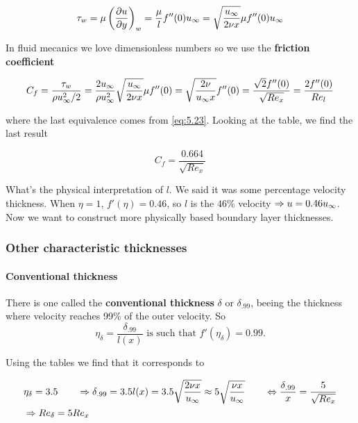 			\begin{equation}
				\tau_w = \mu \left( \frac{\partial u}{\partial y}\right)_w  = \frac{\mu}{l} f''(0) \uinf = \sqrt{\frac{\uinf}{2\nu x}}\mu f''(0)\uinf
			\end{equation}
			
			In fluid mecanics we love dimensionless numbers so we use the \textbf{friction coefficient}
			
			\begin{equation}
				C_f = \frac{\tau _w}{\rho \uinf ^2 /2} = \frac{2 \uinf}{\rho \uinf ^2}\sqrt{\frac{\uinf}{2\nu x}} \mu f''(0) = \sqrt{\frac{2\nu}{\uinf x}} f''(0) = \frac{\sqrt{2}f''(0)}{\sqrt{Re_x}} = \frac{2 f''(0)}{Re_l}
			\end{equation}
			
			where the last equivalence comes from \eqref{eq:5.23}. Looking at the table, we find the last result 
			
			\begin{equation}
				C_f = \frac{0.664}{\sqrt{Re_x}}
			\end{equation}
			
			What's the physical interpretation of $l$.  We said it was some percentage velocity thickness. When $\eta = 1$, $f'(\eta) = 0.46$, so $l$ is the $46\%$ velocity $\Rightarrow u = 0.46 \uinf$. Now we want to construct more physically based boundary layer thicknesses. 
			
		\subsubsection{Other characteristic thicknesses}
			\paragraph{Conventional thickness} There is one called the \textbf{conventional thickness} $\delta$ or $\delta _{.99}$, beeing the thickness where velocity reaches 99\% of the outer velocity. So 
			\begin{equation}
				\eta _{\delta} =\frac{\delta _{.99}}{l(x)} \mbox{ is such that } f'(\eta _\delta) = 0.99. 
			\end{equation}
			
			Using the tables we find that it corresponds to 
			
			\begin{equation}
			\begin{aligned}
				&\eta _\delta = 3.5 \qquad \Rightarrow \delta _{.99} = 3.5 l(x) = 3.5 \sqrt{\frac{2\nu x}{\uinf}} \approx 5 \sqrt{\frac{\nu x}{\uinf}} \qquad \Leftrightarrow \frac{\delta _{.99}}{x} = \frac{5}{\sqrt{Re_x}}\\
				&\Rightarrow Re_\delta = 5 Re_x
			\end{aligned}			
			\end{equation}
			

